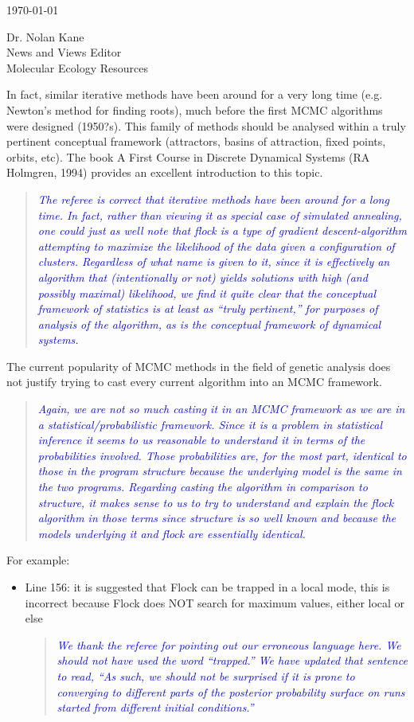 \documentclass[11pt]{letter}
\newcommand{\reply}[1]{\begin{quotation}\small\sl\textcolor{blue}{#1}\end{quotation}}
\begin{document}
\begin{letter}{ \today 

Dr. Nolan Kane\\
News and Views Editor\\
Molecular Ecology Resources \\
}
In fact, similar iterative methods have been around for a very long time (e.g. Newton's method for finding roots), much before the first MCMC algorithms were designed (1950?s). This family of methods should be analysed within a truly pertinent conceptual framework (attractors, basins of attraction, fixed points, orbits, etc). The book A First Course in Discrete Dynamical Systems (RA Holmgren, 1994) provides an excellent introduction to this topic. 
\reply{The referee is correct that iterative methods have been around for a long time.
In fact, rather than viewing it as special case of simulated annealing, one could just as well
note that {\sc flock} is a type of gradient descent-algorithm attempting to maximize the
likelihood of the data given a configuration of clusters.
Regardless of what name is given to it, since it is effectively an algorithm
that (intentionally or not) yields solutions with 
high (and possibly maximal) likelihood, we find it quite clear that  
the conceptual framework of statistics is at least as ``truly pertinent,''
for purposes of analysis of the algorithm, as is
the conceptual framework of dynamical systems.
}


The current popularity of MCMC methods in the field of genetic analysis does not justify trying to cast every current algorithm into an MCMC framework.

\reply{Again, we are not so much casting it in an MCMC framework as we are in a 
statistical/probabilistic framework.  Since it is a problem in statistical inference
it seems to us reasonable to understand it in terms of the probabilities involved. Those
probabilities are, for the most part, identical to those in the program {\sc structure} because
the underlying model is the same in the two programs.  Regarding casting the algorithm in
comparison to {\sc structure}, it makes sense to us to try to understand and explain the {\sc flock}
algorithm in those terms since {\sc structure} is so well known and because the models
underlying it and {\sc flock} are essentially identical.  }

For example:
\begin{itemize}
\item Line 156: it is suggested that Flock can be trapped in a local mode, this is incorrect because Flock does NOT search for maximum values, either local or else
\reply{We thank the referee for pointing out our erroneous language here.  We should not have used
the word ``trapped.''  We have updated that sentence to read, ``As such, we should not be surprised
if it is prone 
to converging to different parts of the posterior probability surface on runs started
from different initial conditions.''}


\end{itemize}
\end{letter}
\end{document}
